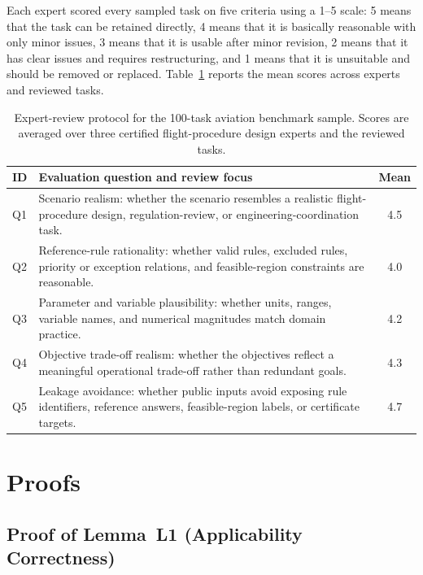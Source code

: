﻿\documentclass[a4paper,fleqn]{cas-dc}
\begin{document}
Each expert scored every sampled task on five criteria using a 1--5 scale:
5 means that the task can be retained directly, 4 means that it is basically
reasonable with only minor issues, 3 means that it is usable after minor
revision, 2 means that it has clear issues and requires restructuring, and
1 means that it is unsuitable and should be removed or replaced. Table~\ref{tab:aviation_expert_review}
reports the mean scores across experts and reviewed tasks.

\begin{table}[H]
\centering
\caption{Expert-review protocol for the 100-task aviation benchmark sample. Scores are averaged over three certified flight-procedure design experts and the reviewed tasks.}
\label{tab:aviation_expert_review}
\footnotesize
\setlength{\tabcolsep}{2pt}
\begin{tabularx}{\columnwidth}{p{}Xc}
\toprule
ID & Evaluation question and review focus & Mean \\
\midrule
Q1 & Scenario realism: whether the scenario resembles a realistic flight-procedure design, regulation-review, or engineering-coordination task. & 4.5 \\
Q2 & Reference-rule rationality: whether valid rules, excluded rules, priority or exception relations, and feasible-region constraints are reasonable. & 4.0 \\
Q3 & Parameter and variable plausibility: whether units, ranges, variable names, and numerical magnitudes match domain practice. & 4.2 \\
Q4 & Objective trade-off realism: whether the objectives reflect a meaningful operational trade-off rather than redundant goals. & 4.3 \\
Q5 & Leakage avoidance: whether public inputs avoid exposing rule identifiers, reference answers, feasible-region labels, or certificate targets. & 4.7 \\
\bottomrule
\end{tabularx}
\end{table}

\section{Proofs}
\label{app:proofs}

\subsection{Proof of Lemma~L1 (Applicability Correctness)}
\end{document}
